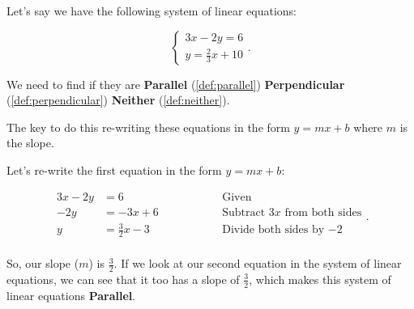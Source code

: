 \begin{example}
  \label{exm:identifying_if_an_equation_is_parallel_perpendicular_or_neither_1}

  Let's say we have the following system of linear equations:
  
  \begin{equation}
    \label{cse:system_of_linear_equations_1}
    \begin{cases}
      3x - 2y = 6 \\
      y = \frac{2}{3}x + 10
    \end{cases}
  .\end{equation}
  
  We need to find if they are \textbf{Parallel} (\ref{def:parallel})
  \textbf{Perpendicular} (\ref{def:perpendicular}) \textbf{Neither}
  (\ref{def:neither}).
  
  The key to do this re-writing these equations in the form $y = mx + b$ where $m$
  is the slope.
  
  Let's re-write the first equation in the form $y = mx + b$:
  
  \begin{equation}
    \label{edt:re_writing_the_first_equation_in_the_form_y_mx_b_1}
    \begin{alignedat}{3}
      3x - 2y &= 6 \qquad\qquad && \textrm{Given} \\
      -2y &= -3x + 6 \qquad\qquad && \textrm{Subtract $3x$ from both sides} \\
      y &= \frac{3}{2}x - 3 \qquad\qquad && \textrm{Divide both sides by $-2$} \\
    \end{alignedat}
  .\end{equation}

  So, our slope ($m$) is $\frac{3}{2}$. If we look at our second equation in the
  system of linear equations, we can see that it too has a slope of
  $\frac{3}{2}$, which makes this system of linear equations \textbf{Parallel}.
\end{example}

